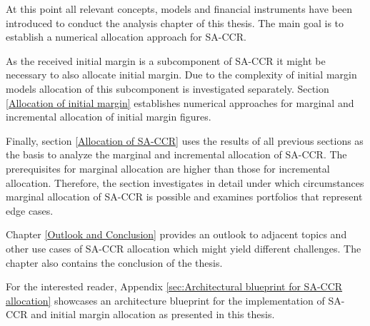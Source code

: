 \documentclass[../Thesis_AHoecherl.tex]{subfiles}
\begin{document}
    At this point all relevant concepts, models and financial instruments have been introduced to conduct the analysis chapter of this thesis. The main goal is to establish a numerical allocation approach for SA-CCR.

    As the received initial margin is a subcomponent of SA-CCR it might be necessary to also allocate initial margin. Due to the complexity of initial margin models allocation of this subcomponent is investigated separately. Section \ref{Allocation of initial margin} establishes numerical approaches for marginal and incremental allocation of initial margin figures.

    Finally, section \ref{Allocation of SA-CCR} uses the results of all previous sections as the basis to analyze the marginal and incremental allocation of SA-CCR. The prerequisites for marginal allocation are higher than those for incremental allocation. Therefore, the section investigates in detail under which circumstances marginal allocation of SA-CCR is possible and examines portfolios that represent edge cases.
    
    Chapter \ref{Outlook and Conclusion} provides an outlook to adjacent topics and other use cases of SA-CCR allocation which might yield different challenges. The chapter also contains the conclusion of the thesis.

    For the interested reader, Appendix \ref{sec:Architectural blueprint for SA-CCR allocation} showcases an architecture blueprint for the implementation of SA-CCR and initial margin allocation as presented in this thesis.
\end{document}
